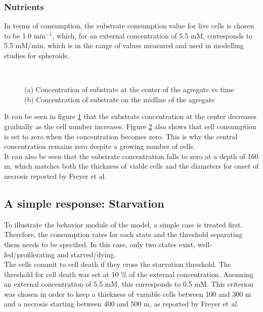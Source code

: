 \documentclass[11pt,a4paper]{article}
\begin{document}
\subsubsection{Nutrients}
In terms of consumption, the substrate consumption value for live cells is chosen to be 1.0 min$^{-1}$, which, for an external concentration of 5.5 mM, corresponds to 5.5 mM/min, which is in the range of values measured and used in modelling studies for spheroids.\cite{Kempf2005}\cite{Mao2018} \\

\begin{figure}[ht!]
\begin{subfigure}{0.5\textwidth}
	\centering
	
	\caption{ \label{ref_S_center}}
\end{subfigure}
~~
\begin{subfigure}{0.5\textwidth}
	\centering
	
	\caption{\label{S_ref_midline}}
\end{subfigure}
\caption{(a) Concentration of substrate at the center of the agregate vs time (b) Concentration of substrate on the midline of the agregate \label{ref_nutrients}}
\end{figure}

It can be seen in figure \ref{ref_S_center} that the substrate concentration at the center decreases gradually as the cell number increases. Figure \ref{S_ref_midline} also shows that cell consumption is set to zero when the concentration becomes zero. This is why the central concentration remains zero despite a growing number of cells.\\

It can also be seen that the substrate concentration falls to zero at a depth of 160 \textmu m, which matches both the thickness of viable cells and the diameters for onset of necrosis reported by Freyer et al.\cite{Freyer1986}\cite{Freyer1988}

\subsection{A simple response: Starvation}
To illustrate the behavior module of the model, a simple case is treated first. Therefore, the consumption rates for each state and the threshold separating them needs to be specified. In this case, only two states exist, well-fed/profilerating and starved/dying.\\

The cells commit to cell death if they cross the starvation threshold. The threshold for cell death was set at 10 \% of the external concentration. Assuming an external concentration of 5.5 mM, this corresponds to 0.5 mM. This criterion was chosen in order to keep a thickness of variable cells between 100 and 300 \textmu m and a necrosis starting between 400 and 500 \textmu m, as reported by Freyer et \textit{al}.\cite{Freyer1986}\\
\end{document}
